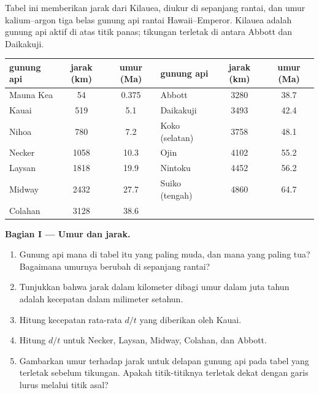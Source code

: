 \begin{problem}
\label{pb:g11:plate-motions:1}
Tabel ini memberikan jarak dari Kilauea, diukur di sepanjang rantai, dan umur
kalium--argon tiga belas gunung api rantai Hawaii--Emperor. Kilauea adalah
gunung api aktif di atas titik panas; tikungan terletak di antara Abbott
dan Daikakuji.

\begin{center}
\small
\begin{tabular}{|l|c|c||l|c|c|}
\hline
gunung api & jarak (\unit{km}) & umur (\unit{Ma}) & gunung api & jarak (\unit{km}) & umur (\unit{Ma}) \\ \hline
Mauna Kea & 54 & 0.375 & Abbott & 3280 & 38.7 \\ \hline
Kauai & 519 & 5.1 & Daikakuji & 3493 & 42.4 \\ \hline
Nihoa & 780 & 7.2 & Koko (selatan) & 3758 & 48.1 \\ \hline
Necker & 1058 & 10.3 & Ojin & 4102 & 55.2 \\ \hline
Laysan & 1818 & 19.9 & Nintoku & 4452 & 56.2 \\ \hline
Midway & 2432 & 27.7 & Suiko (tengah) & 4860 & 64.7 \\ \hline
Colahan & 3128 & 38.6 & & & \\ \hline
\end{tabular}
\end{center}

\medskip
\noindent\textbf{Bagian I --- Umur dan jarak.}
\begin{enumerate}
  \item Gunung api mana di tabel itu yang paling muda, dan mana yang paling
        tua? Bagaimana umurnya berubah di sepanjang rantai?
  \item Tunjukkan bahwa jarak dalam kilometer dibagi umur dalam juta tahun
        adalah kecepatan dalam milimeter setahun.
  \item Hitung kecepatan rata-rata $d/t$ yang diberikan oleh Kauai.
  \item Hitung $d/t$ untuk Necker, Laysan, Midway, Colahan, dan Abbott.
  \item Gambarkan umur terhadap jarak untuk delapan gunung api pada tabel
        yang terletak sebelum tikungan. Apakah titik-titiknya terletak dekat
        dengan garis lurus melalui titik asal?
\end{enumerate}


\end{problem}
